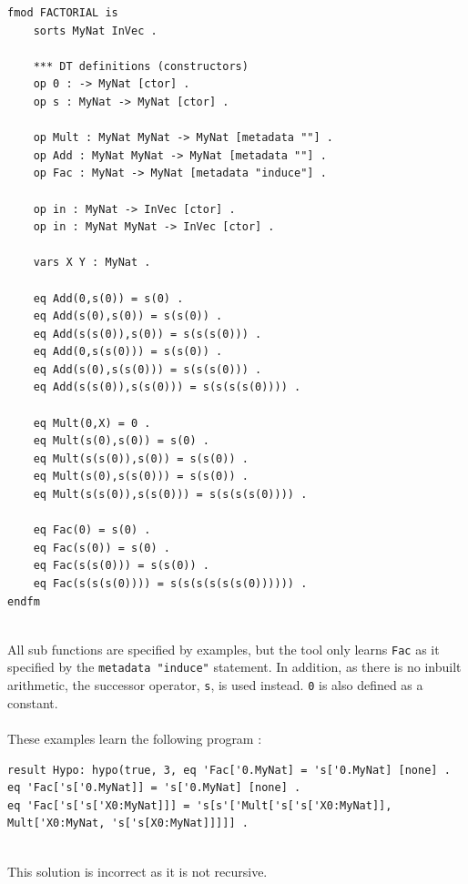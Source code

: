 \begin{lstlisting}
fmod FACTORIAL is
	sorts MyNat InVec .

	*** DT definitions (constructors)
	op 0 : -> MyNat [ctor] .
	op s : MyNat -> MyNat [ctor] .
	
	op Mult : MyNat MyNat -> MyNat [metadata ""] .
	op Add : MyNat MyNat -> MyNat [metadata ""] .
	op Fac : MyNat -> MyNat [metadata "induce"] .

	op in : MyNat -> InVec [ctor] .
	op in : MyNat MyNat -> InVec [ctor] .

	vars X Y : MyNat .
	
	eq Add(0,s(0)) = s(0) .
	eq Add(s(0),s(0)) = s(s(0)) .
	eq Add(s(s(0)),s(0)) = s(s(s(0))) .
	eq Add(0,s(s(0))) = s(s(0)) .
	eq Add(s(0),s(s(0))) = s(s(s(0))) .
	eq Add(s(s(0)),s(s(0))) = s(s(s(s(0)))) .	
	
	eq Mult(0,X) = 0 .
	eq Mult(s(0),s(0)) = s(0) .
	eq Mult(s(s(0)),s(0)) = s(s(0)) .	
	eq Mult(s(0),s(s(0))) = s(s(0)) .
	eq Mult(s(s(0)),s(s(0))) = s(s(s(s(0)))) .
	
	eq Fac(0) = s(0) .
	eq Fac(s(0)) = s(0) .
	eq Fac(s(s(0))) = s(s(0)) .
	eq Fac(s(s(s(0)))) = s(s(s(s(s(s(0)))))) .
endfm
\end{lstlisting}
\mbox{}\\
All sub functions are specified by examples, but the tool only learns \lstinline!Fac! as it specified by the \lstinline!metadata "induce"! statement. In addition, as there is no inbuilt arithmetic, the successor operator, \lstinline!s!, is used instead. \lstinline!0! is also defined as a constant. \\ \\
These examples learn the following program : \\

\begin{lstlisting}
result Hypo: hypo(true, 3, eq 'Fac['0.MyNat] = 's['0.MyNat] [none] .
eq 'Fac['s['0.MyNat]] = 's['0.MyNat] [none] .
eq 'Fac['s['s['X0:MyNat]]] = 's[s'['Mult['s['s['X0:MyNat]], Mult['X0:MyNat, 's['s[X0:MyNat]]]]] .   
\end{lstlisting}
\mbox{}\\
This solution is incorrect as it is not recursive.

\pagebreak
%
%